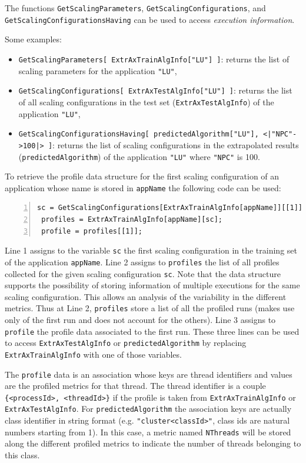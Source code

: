 \documentclass[a4paper, 10pt]{article}
\begin{document}
The functions \verb!GetScalingParameters!, \verb!GetScalingConfigurations!, and \verb!GetScalingConfigurationsHaving! can be used
to access \textit{execution information}.


Some examples:
\begin{itemize}
 \item \verb!GetScalingParameters[ ExtrAxTrainAlgInfo["LU"] ]!: returns the list of scaling parameters for the application \verb!"LU"!,
 \item \verb!GetScalingConfigurations[ ExtrAxTestAlgInfo["LU"] ]!: returns the list of all scaling configurations
 in the test set (\verb!ExtrAxTestAlgInfo!) of the application \verb!"LU"!,
 \item \verb!GetScalingConfigurationsHaving[ predictedAlgorithm["LU"], <|"NPC"->100|> ]!:
 returns the list of scaling configurations
 in the extrapolated results (\verb!predictedAlgorithm!) of the application \verb!"LU"! where \verb!"NPC"! is 100.
\end{itemize}

To retrieve the profile data structure for the first scaling configuration of an application whose name is stored in
\texttt{appName} the following code can be used:
\begin{Verbatim}[obeytabs, tabsize=4, frame=lines, numbers=left]
 sc = GetScalingConfigurations[ExtrAxTrainAlgInfo[appName]][[1]];
 profiles = ExtrAxTrainAlgInfo[appName][sc];
 profile = profiles[[1]];
\end{Verbatim}

Line 1 assigns to the variable \verb!sc! the first scaling configuration in the training set of the application \verb!appName!.
Line 2 assigns to \texttt{profiles} the list of all profiles collected for the given scaling configuration \verb!sc!.
Note that the data structure supports the possibility of storing information of multiple executions for the same scaling configuration.
This allows an analysis of the variability in the different metrics. Thus at Line 2, \texttt{profiles} store
a list of all the profiled runs (\ex makes use only of the first run and does not
account for the others). Line 3 assigns to \verb!profile! the profile data associated to the first run.
These three lines can be used to access \verb!ExtrAxTestAlgInfo! or \verb!predictedAlgorithm! by replacing \verb!ExtrAxTrainAlgInfo!
with one of those variables.

The \verb!profile! data is an association whose keys are thread identifiers and values are the profiled metrics for that thread.
The thread identifier is a couple \verb!{<processId>, <threadId>}! if the profile is taken from
\verb!ExtrAxTrainAlgInfo! or \verb!ExtrAxTestAlgInfo!. For \verb!predictedAlgorithm! the association keys
are actually class identifier in string format (e.g. \verb!"cluster<classId>"!, class ids are natural
numbers starting from 1).
In this case, a metric named \verb!NThreads! will be stored along the different profiled metrics to indicate the number of threads belonging to
this class.
\end{document}
